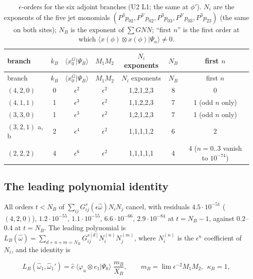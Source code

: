 \documentclass[11pt]{article}
\begin{document}
{\small
\begin{longtable}{lcccccc}
\caption{$\epsilon$-orders for the six adjoint branches (U2 L1; the same at $\phi'$). $N_i$ are the exponents of the five jet monomials $(P^3p_{02},P^{3\prime}p_{02},P^3p_{03},P^{3\prime}p_{03},P^3p_{23})$ (the same on both sites); $N_B$ is the exponent of $\sum GNN$; ``first $n$'' is the first order at which $\langle x(\phi)\otimes x(\phi)|\Psi_n\rangle\ne0$.}\label{tab:order}\\
\toprule
branch & $k_B$ & $\langle x_0^G|\Psi_B\rangle$ & $M_1M_2$ & $N_i$ exponents & $N_B$ & first $n$ \\
\midrule
\endfirsthead
\toprule
branch & $k_B$ & $\langle x_0^G|\Psi_B\rangle$ & $M_1M_2$ & $N_i$ exponents & $N_B$ & first $n$ \\
\midrule
\endhead
\bottomrule
\endlastfoot
$(4,2,0)$ & 0 & $\epsilon^2$ & $\epsilon^2$ & 1,2,1,2,3 & 8 & 0 \\
$(4,1,1)$ & 1 & $\epsilon^3$ & $\epsilon^2$ & 1,1,2,2,3 & 7 & 1 (odd $n$ only) \\
$(3,3,0)$ & 1 & $\epsilon^3$ & $\epsilon^2$ & 1,2,1,2,3 & 7 & 1 (odd $n$ only) \\
$(3,2,1)$ a, b & 2 & $\epsilon^4$ & $\epsilon^2$ & 1,1,1,1,2 & 6 & 2 \\
$(2,2,2)$ & 4 & $\epsilon^6$ & $\epsilon^2$ & 1,1,1,1,1 & 4 & 4 ($n=0..3$ vanish to $10^{-74}$) \\
\end{longtable}}


\subsection{The leading polynomial identity}\label{sec:leadpoly}

All orders $t<N_B$ of $\sum_{ij}G^s_{ij}(\epsilon\hat\omega)N_iN_j$ cancel, with residuals $4.5\cdot10^{-51}$ ($(4,2,0)$), $1.2\cdot10^{-55}$, $1.1\cdot10^{-55}$, $6.6\cdot10^{-66}$, $2.9\cdot10^{-84}$ at $t=N_B-1$, against $0.2$--$0.4$ at $t=N_B$. The leading polynomial is $L_B(\hat\omega)=\sum_{d+n+m=N_B}G^{s[d]}_{ij}N^{(n)}_iN^{(m)}_j$, where $N_i^{(n)}$ is the $\epsilon^n$ coefficient of $N_i$, and the identity is

\begin{equation}
L_B(\hat\omega_1,\hat\omega_1')=\hat c\;\langle\varphi_u\otimes e_1|\Psi_0\rangle\;\frac{m_B}{X_B},\qquad m_B=\lim\epsilon^{-2}M_1M_2,\ \ \kappa_B=1,\label{eq:leadpoly}
\end{equation}
\end{document}
